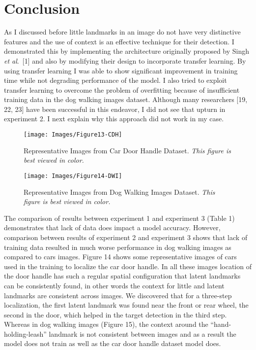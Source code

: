 \documentclass [11pt,letterpaper ,twoside ,openany ]{report}
\begin{document}
    \chapter{Conclusion}
    \doublespacing
    As I discussed before little landmarks in an image do not have very distinctive features and the use of context is an effective technique for their detection. I demonstrated this by implementing the architecture originally proposed by Singh \textit{et al}.\ [1] and also by modifying their design to incorporate transfer learning. By using transfer learning I was able to show significant improvement in training time while not degrading performance of the model. I also tried to exploit transfer learning to overcome the problem of overfitting because of insufficient training data in the dog walking images dataset. Although many researchers [19, 22, 23] have been successful in this endeavor, I did not see that upturn in experiment 2. I next explain why this approach did not work in my case.\\

    \begin{figure}[h]
      \centering
      \texttt{[image: Images/Figure13-CDH]}
      \caption{Representative Images from Car Door Handle Dataset. \textit{This figure is best viewed in color.}}
      \label{fig:cdh}
    \end{figure}        

    \begin{figure}[h]
      \centering
      \texttt{[image: Images/Figure14-DWI]}
      \caption{Representative Images from Dog Walking Images Dataset. \textit{This figure is best viewed in color.}}
      \label{fig:dwi}
    \end{figure}            

    The comparison of results between experiment 1 and experiment 3 (Table 1) demonstrates that lack of data does impact a model accuracy. However, comparison between results of experiment 2 and experiment 3 shows that lack of training data resulted in much worse performance in dog walking images as compared to cars images. Figure 14 shows some representative images of cars used in the training to localize the car door handle. In all these images location of the door handle has such a regular spatial configuration that latent landmarks can be consistently found, in other words the context for little and latent landmarks are consistent across images. We discovered that for a three-step localization, the first latent landmark was found near the front or rear wheel, the second in the door, which helped in the target detection in the third step. Whereas in dog walking images (Figure 15), the context around the ``hand-holding-leash'' landmark is not consistent between images and as a result the model does not train as well as the car door handle dataset model does.
\end{document}

